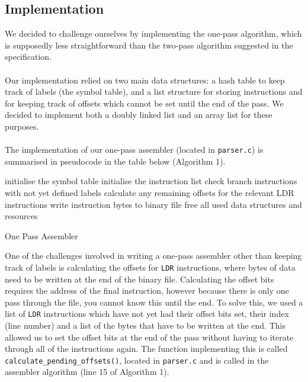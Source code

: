 \documentclass[11pt]{article}
\begin{document}
\subsection{Implementation}
We decided to challenge ourselves by implementing the one-pass algorithm, which is supposedly less straightforward than the two-pass algorithm suggested in the specification.\\\\
Our implementation relied on two main data structures: a hash table to keep track of labels (the symbol table), and a list structure for storing instructions and for keeping track of offsets which cannot be set until the end of the pass. We decided to implement both a doubly linked list and an array list for these purposes. \\\\
The implementation of our one-pass assembler (located in \texttt{parser.c}) is summarised in pseudocode in the table below (Algorithm 1). 

\begin{algorithm}
\SetAlgoLined
initialise the symbol table\;
initialise the instruction list\;
check branch instructions with not yet defined labels\;
calculate any remaining offsets for the relevant LDR instructions\;
write instruction bytes to binary file\;
free all used data structures and resources\;
\caption{One Pass Assembler}
\end{algorithm}

One of the challenges involved in writing a one-pass assembler other than keeping track of labels is calculating the offsets for \texttt{LDR} instructions, where bytes of data need to be written at the end of the binary file. Calculating the offset bits requires the address of the final instruction, however because there is only one pass through the file, you cannot know this until the end. To solve this, we used a list of \texttt{LDR} instructions which have not yet had their offset bits set, their index (line number) and a list of the bytes that have to be written at the end. This allowed us to set the offset bits at the end of the pass without having to iterate through all of the instructions again. The function implementing this is called \texttt{calculate\_pending\_offsets()}, located in \texttt{parser.c} and is called in the assembler algorithm (line 15 of Algorithm 1).
\end{document}
